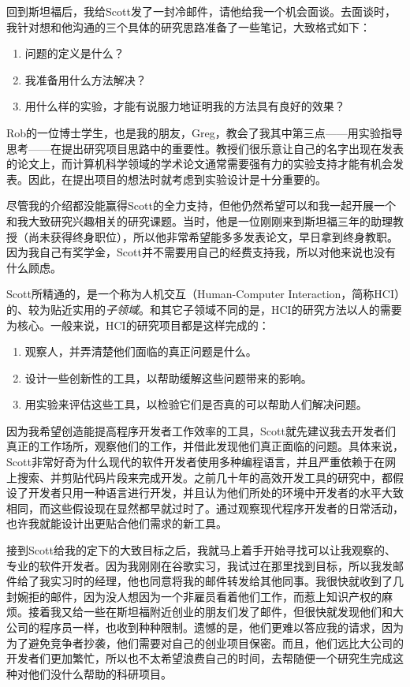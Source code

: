 \documentclass[letter,12pt]{book}
\begin{document}
\begin{CJK}{UTF8}{gbsn}
回到斯坦福后，我给Scott发了一封冷邮件，请他给我一个机会面谈。去面谈时，我针对想和他沟通的三个具体的研究思路准备了一些笔记，大致格式如下：

\begin{enumerate}
\item 问题的定义是什么？
\item 我准备用什么方法解决？
\item 用什么样的实验，才能有说服力地证明我的方法具有良好的效果？
\end{enumerate}

Rob的一位博士学生，也是我的朋友，Greg，教会了我其中第三点——用实验指导思考——在提出研究项目思路中的重要性。教授们很乐意让自己的名字出现在发表的论文上，而计算机科学领域的学术论文通常需要强有力的实验支持才能有机会发表。因此，在提出项目的想法时就考虑到实验设计是十分重要的。

尽管我的介绍都没能赢得Scott的全力支持，但他仍然希望可以和我一起开展一个和我大致研究兴趣相关的研究课题。当时，他是一位刚刚来到斯坦福三年的助理教授（尚未获得终身职位），所以他非常希望能多多发表论文，早日拿到终身教职。因为我自己有奖学金，Scott并不需要用自己的经费支持我，所以对他来说也没有什么顾虑。

\breakline

Scott所精通的，是一个称为人机交互（Human-Computer Interaction，简称HCI）的、较为贴近实用的\emph{子领域}。和其它子领域不同的是，HCI的研究方法以人的需要为核心。一般来说，HCI的研究项目都是这样完成的：

\begin{enumerate}
\item 观察人，并弄清楚他们面临的真正问题是什么。
\item 设计一些创新性的工具，以帮助缓解这些问题带来的影响。
\item 用实验来评估这些工具，以检验它们是否真的可以帮助人们解决问题。
\end{enumerate}

因为我希望创造能提高程序开发者工作效率的工具，Scott就先建议我去开发者们真正的工作场所，观察他们的工作，并借此发现他们真正面临的问题。具体来说，Scott非常好奇为什么现代的软件开发者使用多种编程语言，并且严重依赖于在网上搜索、并剪贴代码片段来完成开发。之前几十年的高效开发工具的研究中，都假设了开发者只用一种语言进行开发，并且认为他们所处的环境中开发者的水平大致相同，而这些假设现在显然都早就过时了。通过观察现代程序开发者的日常活动，也许我就能设计出更贴合他们需求的新工具。

接到Scott给我的定下的大致目标之后，我就马上着手开始寻找可以让我观察的、专业的软件开发者。因为我刚刚在谷歌实习，我试过在那里找到目标，所以我发邮件给了我实习时的经理，他也同意将我的邮件转发给其他同事。我很快就收到了几封婉拒的邮件，因为没人想因为一个非雇员看着他们工作，而惹上知识产权的麻烦。接着我又给一些在斯坦福附近创业的朋友们发了邮件，但很快就发现他们和大公司的程序员一样，也收到种种限制。遗憾的是，他们更难以答应我的请求，因为为了避免竞争者抄袭，他们需要对自己的创业项目保密。而且，他们远比大公司的开发者们更加繁忙，所以也不太希望浪费自己的时间，去帮随便一个研究生完成这种对他们没什么帮助的科研项目。


\end{CJK}
\end{document}
